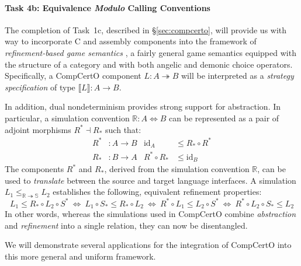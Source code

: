 \vspace*{-2ex}
\paragraph*{Task 4b: Equivalence \emph{Modulo} Calling Conventions}




The completion of Task~1c, described in \S\ref{sec:compcerto},
will provide us with way to incorporate C and assembly components
into the framework of \emph{refinement-based game semantics} \cite{koenig20},
a fairly general game semantics
equipped with the structure of a category
and with both angelic and demonic choice operators.
Specifically,
a CompCertO component $L : A \twoheadrightarrow B$
will be interpreted as a \emph{strategy specification} of type
$\llbracket L \rrbracket : A \rightarrow B$.

In addition, dual nondeterminism provides strong support for abstraction.
In particular,
a simulation convention $\mathbb{R} : A \Leftrightarrow B$
can be represented as a pair of adjoint morphisms $R^* \dashv R_*$ such that:
\begin{align*}
  R^* &: A \rightarrow B &
  \mathrm{id}_A &\le R_* \circ R^* \\
  R_* &: B \rightarrow A &
  R^* \circ R_* &\le \mathrm{id}_B
\end{align*}
The components $R^*$ and $R_*$,
derived from the simulation convention $\mathbb{R}$,
can be used
to \emph{translate} between the source and target language interfaces.
A simulation $L_1 \le_{\mathbb{R} \twoheadrightarrow \mathbb{S}} L_2$
establishes the following, equivalent refinement properties:
\[
  L_1 \le R_* \circ L_2 \circ S^* \: \Leftrightarrow \:
  L_1 \circ S_* \le R_* \circ L_2 \: \Leftrightarrow \:
  R^* \circ L_1 \le L_2 \circ S^* \: \Leftrightarrow \:
  R^* \circ L_2 \circ S_* \le L_2
\]
In other words,
whereas the simulations used in CompCertO
combine \emph{abstraction} and \emph{refinement}
into a single relation,
they can now be disentangled.

We will demonstrate several applications for
the integration of CompCertO into this more general and uniform framework.

